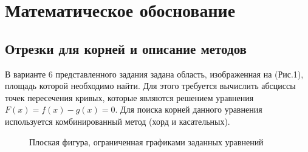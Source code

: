 \documentclass[a4paper,12pt,titlepage,finall]{article}
\begin{document}
\newpage

\section{Математическое обоснование}
\subsection{Отрезки для корней и описание методов}
В варианте 6 представленного задания задана область, изображенная на (Рис.1), площадь которой необходимо найти. Для этого требуется вычислить абсциссы точек пересечения кривых, которые являются решением уравнения {$F(x) = f(x) - g(x) = 0$}. Для поиска корней данного уравнения используется комбинированный метод (хорд и касательных). \\\par

\begin{figure}[h]
\centering
{}
\caption{Плоская фигура, ограниченная графиками заданных уравнений}
\label{plot1}
\end{figure}
\end{document}

